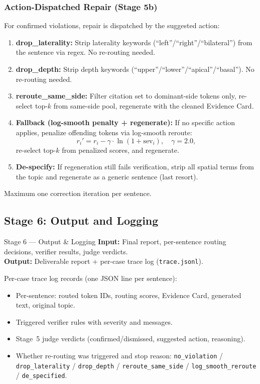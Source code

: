 \documentclass[11pt,a4paper]{article}
\begin{document}
\subsubsection{Action-Dispatched Repair (Stage 5b)}
For confirmed violations, repair is dispatched by the suggested action:
\begin{enumerate}[nosep]
    \item \textbf{drop\_laterality:} Strip laterality keywords (``left''/``right''/``bilateral'') from the sentence via regex. No re-routing needed.
    \item \textbf{drop\_depth:} Strip depth keywords (``upper''/``lower''/``apical''/``basal''). No re-routing needed.
    \item \textbf{reroute\_same\_side:} Filter citation set to dominant-side tokens only, re-select top-$k$ from same-side pool, regenerate with the cleaned Evidence Card.
    \item \textbf{Fallback (log-smooth penalty + regenerate):} If no specific action applies, penalize offending tokens via log-smooth reroute:
    \begin{equation}
    r_i' = r_i - \gamma \cdot \ln(1 + \mathrm{sev}_i), \quad \gamma = 2.0,
    \label{eq:log_smooth}
    \end{equation}
    re-select top-$k$ from penalized scores, and regenerate.
    \item \textbf{De-specify:} If regeneration still fails verification, strip all spatial terms from the topic and regenerate as a generic sentence (last resort).
\end{enumerate}
Maximum one correction iteration per sentence.

\subsection{Stage 6: Output and Logging}

\begin{stagebox}{Stage 6 --- Output \& Logging}
\textcolor{inputcolor}{\textbf{Input:}} Final report, per-sentence routing decisions, verifier results, judge verdicts.\\
\textcolor{outputcolor}{\textbf{Output:}} Deliverable report + per-case trace log (\texttt{trace.jsonl}).
\end{stagebox}

Per-case trace log records (one JSON line per sentence):
\begin{itemize}[nosep]
    \item Per-sentence: routed token IDs, routing scores, Evidence Card, generated text, original topic.
    \item Triggered verifier rules with severity and messages.
    \item Stage~5 judge verdicts (confirmed/dismissed, suggested action, reasoning).
    \item Whether re-routing was triggered and stop reason: \texttt{no\_violation} / \texttt{drop\_laterality} / \texttt{drop\_depth} / \texttt{reroute\_same\_side} / \texttt{log\_smooth\_reroute} / \texttt{de\_specified}.
\end{itemize}
\end{document}
